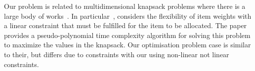 Our problem is related to multidimensional knapsack problems where there is a large body of
works~\cite{knapsacks, numbers}. In particular~\cite{Nip2017}, considers the flexibility of item weights with a linear
constraint that must be fulfilled for the item to be allocated. The paper provides a pseudo-polynomial time complexity
algorithm for solving this problem to maximize the values in the knapsack. Our optimisation problem case is similar to
their, but differs due to constraints with our using non-linear not linear constraints.
